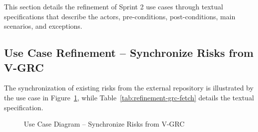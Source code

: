 This section details the refinement of Sprint 2 use cases through textual specifications that describe the actors, pre-conditions, post-conditions, main scenarios, and exceptions.

\subsection{Use Case Refinement -- Synchronize Risks from V-GRC}

The synchronization of existing risks from the external repository is illustrated by the use case in Figure~\ref{fig:usecase-grc-fetch}, while Table~\ref{tab:refinement-grc-fetch} details the textual specification.

\begin{figure}[H]
\centering
{}
\caption{Use Case Diagram -- Synchronize Risks from V-GRC}
\label{fig:usecase-grc-fetch}
\end{figure}

